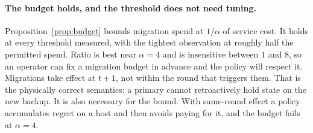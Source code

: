 \paragraph{The budget holds, and the threshold does not need tuning.}
Proposition~\ref{prop:budget} bounds migration spend at $1/\alpha$ of service
cost. It holds at every threshold measured, with the tightest observation at
roughly half the permitted spend. Ratio is best near $\alpha = 4$ and is
insensitive between $1$ and $8$, so an operator can fix a migration budget in
advance and the policy will respect it. Migrations take effect at $t+1$, not within the round that triggers them.
That is the physically correct semantics: a primary cannot retroactively hold
state on the new backup. It is also necessary for the bound. With same-round
effect a policy accumulates regret on a host and then avoids paying for it, and
the budget fails at $\alpha = 4$.
